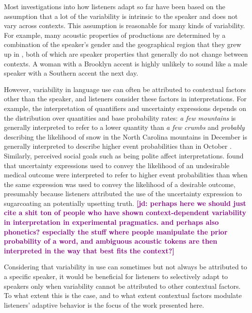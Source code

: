 \documentclass[man,floatsintext]{apa6}
\newcommand{\jd}[1]{\textcolor{Purple}{\bf [jd: #1]}}
\begin{document}
Most investigations into how listeners adapt so far have been based on the assumption that a lot of the variability is intrinsic to the speaker and does not vary across contexts. This assumption is reasonable for many kinds of variability. For example, many acoustic properties of productions are determined by a combination of the speaker's gender and the geographical region that they grew up in \cite{Kleinschmidt2019}, both of which are speaker properties that generally do not change between contexts. A woman with a Brooklyn accent is highly unlikely to sound like a male speaker with a Southern accent the next day. 

However, variability in language use can often be attributed to contextual factors other than the speaker, and listeners consider these factors in interpretations. 
For example, the interpretation of quantifiers and uncertainty expressions depends on the distribution over quantities and base probability rates: \textit{a few mountains} is generally interpreted to refer to a lower quantity than \textit{a few crumbs} \cite{Clark1991,Scholler2017} and \textit{probably} describing the likelihood of snow in the North Carolina mountains in December is generally interpreted to describe higher event probabilities than in October \cite{Wallsten1986b}. Similarly, perceived social goals such as being polite affect interpretations. \cite{Pighin2011} found that uncertainty expressions used to convey the likelihood of an undesirable medical outcome were interpreted to refer to higher event probabilities than when the same expression was used to convey the likelihood of a desirable outcome, presumably because listeners attributed the use of the uncertainty expression to sugarcoating an potentially upsetting truth. \jd{perhaps here we should just cite a shit ton of people who have shown context-dependent variability in interpretation in experimental pragmatics. and perhaps also phonetics? especially the stuff where people manipulate the prior probability of a word, and ambiguous acoustic tokens are then interpreted in the way that best fits the context?}

Considering that variability in use can sometimes but not always be attributed to a specific speaker, it would be beneficial for listeners to selectively adapt to speakers only when variability cannot be attributed to other contextual factors. To what extent this is the case, and to what extent contextual factors modulate listeners' adaptive behavior is the focus of the work presented here. 
\end{document}
